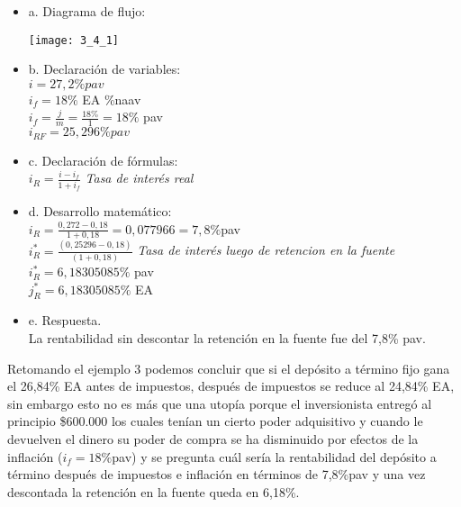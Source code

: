 \begin{itemize}
	\item a. Diagrama de flujo:\\
	\begin{center}
		\texttt{[image: 3\_4\_1]}
	\end{center}
	\item b. Declaración de variables:\\
    
    $i=27,2\% pav $\\
	$i_{f} = 18\%$  EA \%naav \\
    $i_{f} = \frac{j}{m} = \frac{18\%}{1} = 18\%$ pav \\
    $i_{RF} = 25,296\% pav$\\ 
	\item c. Declaración de fórmulas:\\
	$ i_{R} = \frac{i-i_{f}}{1+i_{f}} $\hspace{35}\textit{ Tasa de interés real}\\
	\item d. Desarrollo matemático:\\
	
	$i_{R} = \frac{0,272-0,18}{1+0,18} = 0,077966 = 7,8\% $pav\\
	$i^{*}_{R} = \frac{(0,25296-0,18)}{(1 + 0,18)}$ \hspace{35}\textit{ Tasa de interés luego de retencion en la fuente}\\
    $i^{*}_{R} = 6,18305085\%$ pav \\
    $j^{*}_{R} = 6,18305085\%$ EA \\
	\item e. Respuesta.\\
	La rentabilidad sin descontar la retención en la fuente  fue del 7,8\% pav.\\
	\end {itemize}
	
	
	Retomando el ejemplo 3 podemos concluir que si el depósito a término fijo gana el 26,84\% EA antes de impuestos, después de impuestos se reduce al 24,84\% EA, sin embargo esto no es más que una utopía porque el inversionista entregó al principio \$600.000 los cuales tenían un cierto poder adquisitivo y cuando le devuelven el dinero su poder de compra se ha disminuido por efectos de la inflación ($i_{f}= 18\% $pav$ $) y se pregunta cuál sería la rentabilidad del depósito a término después de impuestos e inflación en términos de 7,8\%pav y una vez descontada la retención en la fuente queda en 6,18\%.\\
	

